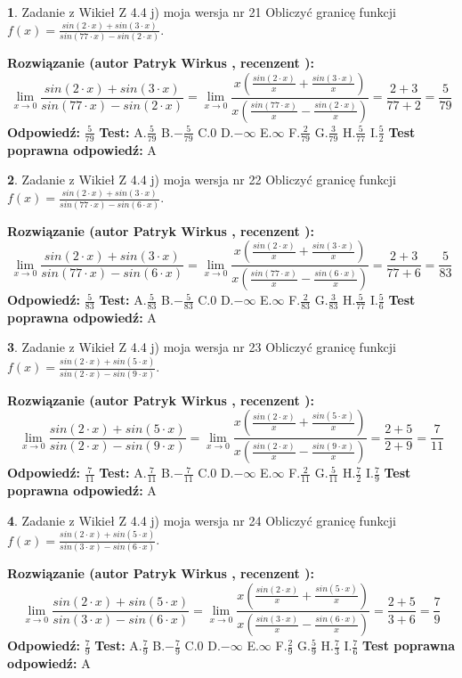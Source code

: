 \documentclass[12pt, a4paper]{article}
\theoremstyle{definition} %
\newtheorem{zad}{}
\newcommand{\zadStart}[1]{\begin{zad}#1\newline}
\newcommand{\zadStop}{\end{zad}}
\newcommand{\rozwStart}[2]{\noindent \textbf{Rozwiązanie (autor #1 , recenzent #2): }\newline}
\newcommand{\rozwStop}{\newline}
\newcommand{\odpStart}{\noindent \textbf{Odpowiedź:}\newline}
\newcommand{\odpStop}{\newline}
\newcommand{\testStart}{\noindent \textbf{Test:}\newline}
\newcommand{\testStop}{\newline}
\newcommand{\kluczStart}{\noindent \textbf{Test poprawna odpowiedź:}\newline}
\newcommand{\kluczStop}{\newline}
\begin{document}
\zadStart{Zadanie z Wikieł Z 4.4 j) moja wersja nr 21}
Obliczyć granicę funkcji $f(x)=\frac{sin(2\cdot x) +sin(3\cdot x)}{sin(77\cdot x) -sin(2\cdot x)}$.
\zadStop
\rozwStart{Patryk Wirkus}{}
$$\lim\limits_{x\to 0}\frac{sin(2\cdot x) +sin(3\cdot x)}{sin(77\cdot x) -sin(2\cdot x)}=\lim\limits_{x\to 0}\frac{x(\frac{sin(2\cdot x)}{x}+\frac{sin(3\cdot x)}{x})}{x(\frac{sin(77\cdot x)}{x}-\frac{sin(2\cdot x)}{x})}=\frac{2+3}{77+2} = \frac{5}{79}$$
\rozwStop
\odpStart
$\frac{5}{79}$
\odpStop
\testStart
A.$\frac{5}{79}$
B.$-\frac{5}{79}$
C.$0$
D.$-\infty$
E.$\infty$
F.$\frac{2}{79}$
G.$\frac{3}{79}$
H.$\frac{5}{77}$
I.$\frac{5}{2}$
\testStop
\kluczStart
A
\kluczStop



\zadStart{Zadanie z Wikieł Z 4.4 j) moja wersja nr 22}
Obliczyć granicę funkcji $f(x)=\frac{sin(2\cdot x) +sin(3\cdot x)}{sin(77\cdot x) -sin(6\cdot x)}$.
\zadStop
\rozwStart{Patryk Wirkus}{}
$$\lim\limits_{x\to 0}\frac{sin(2\cdot x) +sin(3\cdot x)}{sin(77\cdot x) -sin(6\cdot x)}=\lim\limits_{x\to 0}\frac{x(\frac{sin(2\cdot x)}{x}+\frac{sin(3\cdot x)}{x})}{x(\frac{sin(77\cdot x)}{x}-\frac{sin(6\cdot x)}{x})}=\frac{2+3}{77+6} = \frac{5}{83}$$
\rozwStop
\odpStart
$\frac{5}{83}$
\odpStop
\testStart
A.$\frac{5}{83}$
B.$-\frac{5}{83}$
C.$0$
D.$-\infty$
E.$\infty$
F.$\frac{2}{83}$
G.$\frac{3}{83}$
H.$\frac{5}{77}$
I.$\frac{5}{6}$
\testStop
\kluczStart
A
\kluczStop



\zadStart{Zadanie z Wikieł Z 4.4 j) moja wersja nr 23}
Obliczyć granicę funkcji $f(x)=\frac{sin(2\cdot x) +sin(5\cdot x)}{sin(2\cdot x) -sin(9\cdot x)}$.
\zadStop
\rozwStart{Patryk Wirkus}{}
$$\lim\limits_{x\to 0}\frac{sin(2\cdot x) +sin(5\cdot x)}{sin(2\cdot x) -sin(9\cdot x)}=\lim\limits_{x\to 0}\frac{x(\frac{sin(2\cdot x)}{x}+\frac{sin(5\cdot x)}{x})}{x(\frac{sin(2\cdot x)}{x}-\frac{sin(9\cdot x)}{x})}=\frac{2+5}{2+9} = \frac{7}{11}$$
\rozwStop
\odpStart
$\frac{7}{11}$
\odpStop
\testStart
A.$\frac{7}{11}$
B.$-\frac{7}{11}$
C.$0$
D.$-\infty$
E.$\infty$
F.$\frac{2}{11}$
G.$\frac{5}{11}$
H.$\frac{7}{2}$
I.$\frac{7}{9}$
\testStop
\kluczStart
A
\kluczStop



\zadStart{Zadanie z Wikieł Z 4.4 j) moja wersja nr 24}
Obliczyć granicę funkcji $f(x)=\frac{sin(2\cdot x) +sin(5\cdot x)}{sin(3\cdot x) -sin(6\cdot x)}$.
\zadStop
\rozwStart{Patryk Wirkus}{}
$$\lim\limits_{x\to 0}\frac{sin(2\cdot x) +sin(5\cdot x)}{sin(3\cdot x) -sin(6\cdot x)}=\lim\limits_{x\to 0}\frac{x(\frac{sin(2\cdot x)}{x}+\frac{sin(5\cdot x)}{x})}{x(\frac{sin(3\cdot x)}{x}-\frac{sin(6\cdot x)}{x})}=\frac{2+5}{3+6} = \frac{7}{9}$$
\rozwStop
\odpStart
$\frac{7}{9}$
\odpStop
\testStart
A.$\frac{7}{9}$
B.$-\frac{7}{9}$
C.$0$
D.$-\infty$
E.$\infty$
F.$\frac{2}{9}$
G.$\frac{5}{9}$
H.$\frac{7}{3}$
I.$\frac{7}{6}$
\testStop
\kluczStart
A
\kluczStop
\end{document}
